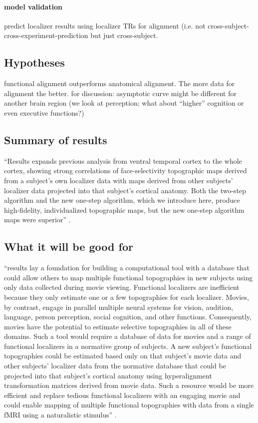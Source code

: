 \paragraph{model validation}


predict localizer results using localizer TRs for alignment (i.e. not
cross-subject-cross-experiment-prediction but just cross-subject.


\subsection{Hypotheses}
%
functional alignment outperforms anatomical alignment.
%
The more data for alignment the better.
%
for discussion: asymptotic curve might be different for another brain region
(we look at perception; what about ``higher'' cognition or even executive
functions?)


\subsection{Summary of results}
%
``Results expands previous analysis from ventral temporal cortex to the whole
cortex, showing strong correlations of face-selectivity topographic maps derived
from a subject's own localizer data with maps derived from other subjects'
localizer data projected into that subject's cortical anatomy. Both the two-step
algorithm and the new one-step algorithm, which we introduce here, produce
high-fidelity, individualized topographic maps, but the new one-step algorithm
maps were superior'' \citep{jiahui2020predicting}.


\subsection{What it will be good for}

%
``results lay a foundation for building a computational tool with a
database that could allow others to map multiple functional topographies in new
subjects using only data collected during movie viewing. Functional localizers
are inefficient because they only estimate one or a few topographies for each
localizer. Movies, by contrast, engage in parallel multiple neural systems for
vision, audition, language, person perception, social cognition, and other
functions. Consequently, movies have the potential to estimate selective
topographies in all of these domains. Such a tool would require a database of
data for movies and a range of functional localizers in a normative group of
subjects. A new subject's functional topographies could be estimated based only
on that subject's movie data and other subjects’ localizer data from the
normative database that could be projected into that subject’s cortical anatomy
using hyperalignment transformation matrices derived from movie data. Such a
resource would be more efficient and replace tedious functional localizers with
an engaging movie and could enable mapping of multiple functional topographies
with data from a single fMRI using a naturalistic stimulus''
\citep{jiahui2020predicting}.


